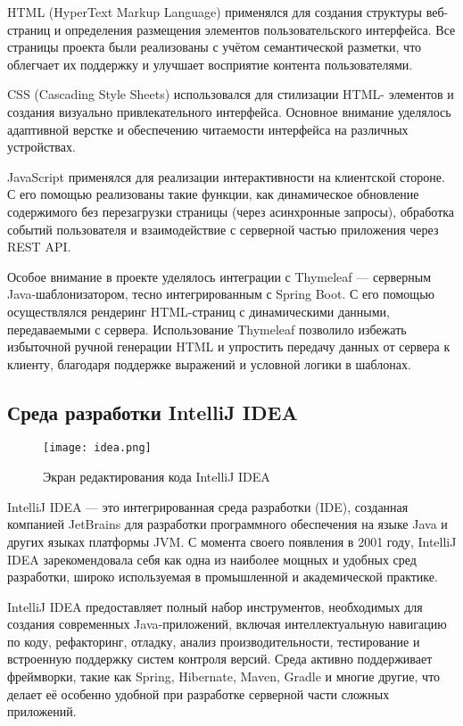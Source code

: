 HTML (HyperText Markup Language) применялся для создания структуры веб-страниц и определения размещения элементов пользовательского интерфейса. Все страницы проекта были реализованы с учётом семантической разметки, что облегчает их поддержку и улучшает восприятие контента пользователями.

CSS (Cascading Style Sheets) использовался для стилизации HTML-  элементов и создания визуально привлекательного интерфейса. Основное внимание уделялось адаптивной верстке и обеспечению читаемости интерфейса на различных устройствах.

JavaScript применялся для реализации интерактивности на клиентской стороне. С его помощью реализованы такие функции, как динамическое обновление содержимого без перезагрузки страницы (через асинхронные запросы), обработка событий пользователя и взаимодействие с серверной частью приложения через REST API.

Особое внимание в проекте уделялось интеграции с Thymeleaf — серверным Java-шаблонизатором, тесно интегрированным с Spring Boot. С его помощью осуществлялся рендеринг HTML-страниц с динамическими данными, передаваемыми с сервера. Использование Thymeleaf позволило избежать избыточной ручной генерации HTML и упростить передачу данных от сервера к клиенту, благодаря поддержке выражений и условной логики в шаблонах.

\subsection{Среда разработки IntelliJ IDEA}

\begin{figure}[H]
    \texttt{[image: idea.png]}
    \caption{Экран редактирования кода IntelliJ IDEA}
\end{figure}

IntelliJ IDEA — это интегрированная среда разработки (IDE), созданная компанией JetBrains для разработки программного обеспечения на языке Java и других языках платформы JVM. С момента своего появления в 2001 году, IntelliJ IDEA зарекомендовала себя как одна из наиболее мощных и удобных сред разработки, широко используемая в промышленной и академической практике. \cite{idea}

IntelliJ IDEA предоставляет полный набор инструментов, необходимых для создания современных Java-приложений, включая интеллектуальную навигацию по коду, рефакторинг, отладку, анализ производительности, тестирование и встроенную поддержку систем контроля версий. Среда активно поддерживает фреймворки, такие как Spring, Hibernate, Maven, Gradle и многие другие, что делает её особенно удобной при разработке серверной части сложных приложений.

